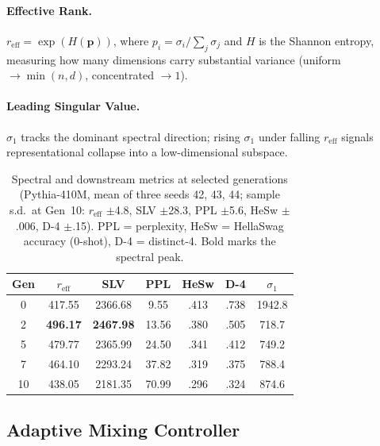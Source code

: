 \paragraph{Effective Rank.}
$r_{\text{eff}} = \exp(H(\mathbf{p}))$, where $p_i = \sigma_i / \sum_j \sigma_j$ and $H$ is the Shannon entropy, measuring how many dimensions carry substantial variance (uniform $\to \min(n,d)$, concentrated $\to 1$).

\paragraph{Leading Singular Value.}
$\sigma_1$ tracks the dominant spectral direction; rising $\sigma_1$ under falling $r_{\text{eff}}$ signals representational collapse into a low-dimensional subspace.

\begin{table}[t]
\centering
\small
\setlength{\tabcolsep}{4pt}
\begin{tabular}{@{}ccccccc@{}}
\toprule
Gen & $r_{\text{eff}}$ & SLV & PPL & HeSw & D-4 & $\sigma_1$ \\
\midrule
0  & 417.55 & 2366.68 &  9.55 & .413 & .738 & 1942.8 \\
2  & \textbf{496.17} & \textbf{2467.98} & 13.56 & .380 & .505 &  718.7 \\
5  & 479.77 & 2365.99 & 24.50 & .341 & .412 &  749.2 \\
7  & 464.10 & 2293.24 & 37.82 & .319 & .375 &  788.4 \\
10 & 438.05 & 2181.35 & 70.99 & .296 & .324 &  874.6 \\
\bottomrule
\end{tabular}
\caption{Spectral and downstream metrics at selected generations (Pythia-410M, mean of three seeds 42, 43, 44; sample s.d.\ at Gen~10: $r_{\text{eff}}$ $\pm$4.8, SLV $\pm$28.3, PPL $\pm$5.6, HeSw $\pm$.006, D-4 $\pm$.15). PPL = perplexity, HeSw = HellaSwag accuracy (0-shot), D-4 = distinct-4. Bold marks the spectral peak.}
\label{tab:phase0}
\end{table}

\subsection{Adaptive Mixing Controller}
\label{subsec:controller}

